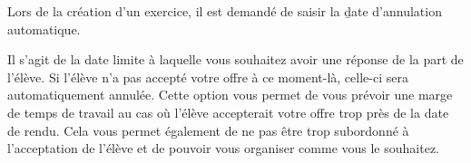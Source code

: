Lors de la création d'un exercice, il est demandé de saisir la \b{date d'annulation automatique}.

Il s'agit de la date limite à laquelle vous souhaitez avoir une réponse de la part de l'élève.
Si l'élève n'a pas accepté votre offre à ce moment-là, celle-ci sera automatiquement annulée. Cette option vous permet de vous prévoir une marge de temps de travail au cas où l'élève accepterait votre offre trop près de la date de rendu. Cela vous permet également de ne pas être trop subordonné à l'acceptation de l'élève et de pouvoir vous organiser comme vous le souhaitez.